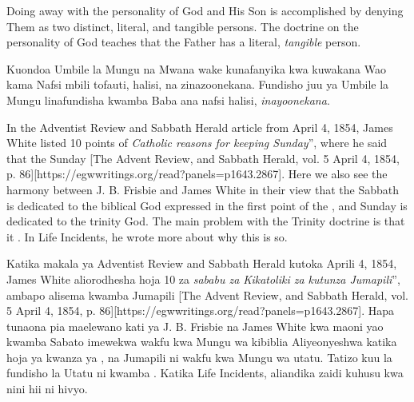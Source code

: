 Doing away with the personality of God and His Son is accomplished by denying Them as two distinct, literal, and tangible persons. The doctrine on the personality of God teaches that the Father has a literal, \textit{tangible} person.


Kuondoa Umbile la Mungu na Mwana wake kunafanyika kwa kuwakana Wao kama Nafsi mbili tofauti, halisi, na zinazoonekana. Fundisho juu ya Umbile la Mungu linafundisha kwamba Baba ana nafsi halisi, \textit{inayoonekana}.


In the Adventist Review and Sabbath Herald article from April 4, 1854, James White listed 10 points of \textit{Catholic reasons for keeping Sunday}”, where he said that the Sunday [The Advent Review, and Sabbath Herald, vol. 5 April 4, 1854, p. 86][https://egwwritings.org/read?panels=p1643.2867]. Here we also see the harmony between J. B. Frisbie and James White in their view that the Sabbath is dedicated to the biblical God expressed in the first point of the , and Sunday is dedicated to the trinity God. The main problem with the Trinity doctrine is that it . In Life Incidents, he wrote more about why this is so.


Katika makala ya Adventist Review and Sabbath Herald kutoka Aprili 4, 1854, James White aliorodhesha hoja 10 za \textit{sababu za Kikatoliki za kutunza Jumapili}”, ambapo alisema kwamba Jumapili [The Advent Review, and Sabbath Herald, vol. 5 April 4, 1854, p. 86][https://egwwritings.org/read?panels=p1643.2867]. Hapa tunaona pia maelewano kati ya J. B. Frisbie na James White kwa maoni yao kwamba Sabato imewekwa wakfu kwa Mungu wa kibiblia Aliyeonyeshwa katika hoja ya kwanza ya , na Jumapili ni wakfu kwa Mungu wa utatu. Tatizo kuu la fundisho la Utatu ni kwamba . Katika Life Incidents, aliandika zaidi kuhusu kwa nini hii ni hivyo.


